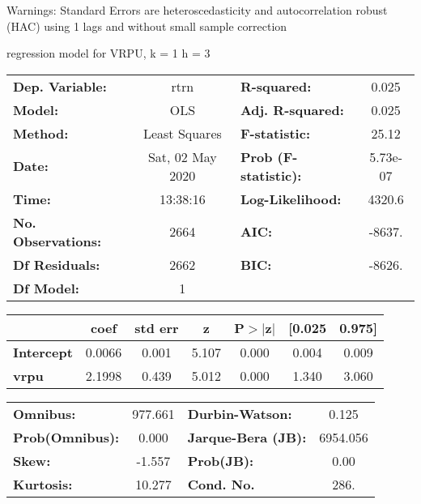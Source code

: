 Warnings: \newline
 [1] Standard Errors are heteroscedasticity and autocorrelation robust (HAC) using 1 lags and without small sample correction\ 

regression model for VRPU, k = 1 h = 3\begin{center}
\begin{tabular}{lclc}
\toprule
\textbf{Dep. Variable:}    &       rtrn       & \textbf{  R-squared:         } &     0.025   \\
\textbf{Model:}            &       OLS        & \textbf{  Adj. R-squared:    } &     0.025   \\
\textbf{Method:}           &  Least Squares   & \textbf{  F-statistic:       } &     25.12   \\
\textbf{Date:}             & Sat, 02 May 2020 & \textbf{  Prob (F-statistic):} &  5.73e-07   \\
\textbf{Time:}             &     13:38:16     & \textbf{  Log-Likelihood:    } &    4320.6   \\
\textbf{No. Observations:} &        2664      & \textbf{  AIC:               } &    -8637.   \\
\textbf{Df Residuals:}     &        2662      & \textbf{  BIC:               } &    -8626.   \\
\textbf{Df Model:}         &           1      & \textbf{                     } &             \\
\bottomrule
\end{tabular}
\begin{tabular}{lcccccc}
                   & \textbf{coef} & \textbf{std err} & \textbf{z} & \textbf{P$> |$z$|$} & \textbf{[0.025} & \textbf{0.975]}  \\
\midrule
\textbf{Intercept} &       0.0066  &        0.001     &     5.107  &         0.000        &        0.004    &        0.009     \\
\textbf{vrpu}      &       2.1998  &        0.439     &     5.012  &         0.000        &        1.340    &        3.060     \\
\bottomrule
\end{tabular}
\begin{tabular}{lclc}
\textbf{Omnibus:}       & 977.661 & \textbf{  Durbin-Watson:     } &    0.125  \\
\textbf{Prob(Omnibus):} &   0.000 & \textbf{  Jarque-Bera (JB):  } & 6954.056  \\
\textbf{Skew:}          &  -1.557 & \textbf{  Prob(JB):          } &     0.00  \\
\textbf{Kurtosis:}      &  10.277 & \textbf{  Cond. No.          } &     286.  \\
\bottomrule
\end{tabular}
\end{center}

